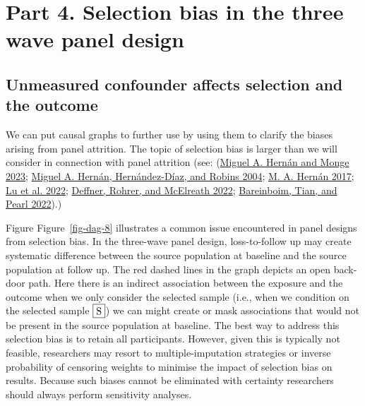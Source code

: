 \documentclass[
  singlecolumn]{report}
\begin{document}
\hypertarget{part-4.-selection-bias-in-the-three-wave-panel-design}{%
\section{Part 4. Selection bias in the three wave panel
design}\label{part-4.-selection-bias-in-the-three-wave-panel-design}}

\hypertarget{unmeasured-confounder-affects-selection-and-the-outcome}{%
\subsection{Unmeasured confounder affects selection and the
outcome}\label{unmeasured-confounder-affects-selection-and-the-outcome}}

We can put causal graphs to further use by using them to clarify the
biases arising from panel attrition. The topic of selection bias is
larger than we will consider in connection with panel attrition (see:
(\protect\hyperlink{ref-hernuxe1n2023}{Miguel A. Hernán and Monge 2023};
\protect\hyperlink{ref-hernuxe1n2004a}{Miguel A. Hernán, Hernández-Díaz,
and Robins 2004}; \protect\hyperlink{ref-hernuxe1n2017}{M. A. Hernán
2017}; \protect\hyperlink{ref-lu2022}{Lu et al. 2022};
\protect\hyperlink{ref-deffner2022}{Deffner, Rohrer, and McElreath
2022}; \protect\hyperlink{ref-bareinboim2022}{Bareinboim, Tian, and
Pearl 2022}).)

Figure Figure~\ref{fig-dag-8} illustrates a common issue encountered in
panel designs from selection bias. In the three-wave panel design,
loss-to-follow up may create systematic difference between the source
population at baseline and the source population at follow up. The red
dashed lines in the graph depicts an open back-door path. Here there is
an indirect association between the exposure and the outcome when we
only consider the selected sample (i.e., when we condition on the
selected sample \(\framebox{S}\)) we can might create or mask
associations that would not be present in the source population at
baseline. The best way to address this selection bias is to retain all
participants. However, given this is typically not feasible, researchers
may resort to multiple-imputation strategies or inverse probability of
censoring weights to minimise the impact of selection bias on results.
Because such biases cannot be eliminated with certainty researchers
should always perform sensitivity analyses.
\end{document}
